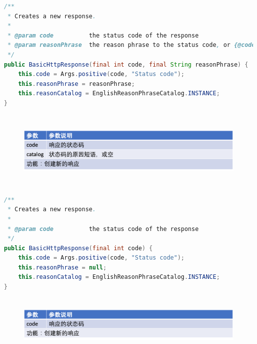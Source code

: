 \documentclass{article}
\begin{document}
	\begin{lstlisting}[language={java}]
/**
 * Creates a new response.
 *
 * @param code          the status code of the response
 * @param reasonPhrase  the reason phrase to the status code, or {@code null}
 */
public BasicHttpResponse(final int code, final String reasonPhrase) {
    this.code = Args.positive(code, "Status code");
    this.reasonPhrase = reasonPhrase;
    this.reasonCatalog = EnglishReasonPhraseCatalog.INSTANCE;
}

	\end{lstlisting}

	\begin{figure}[H]
		\centering
		\includegraphics[height = 3.8cm, width = 18cm]{pics/25_Response_table_2.png}	
	\end{figure}

	\begin{lstlisting}[language={java}]
/**
 * Creates a new response.
 *
 * @param code          the status code of the response
 */
public BasicHttpResponse(final int code) {
    this.code = Args.positive(code, "Status code");
    this.reasonPhrase = null;
    this.reasonCatalog = EnglishReasonPhraseCatalog.INSTANCE;
}

	\end{lstlisting}

	\begin{figure}[H]
		\centering
		\includegraphics[height = 2.8cm, width = 18cm]{pics/26_Response_table_3.png}	
	\end{figure}
\end{document}
